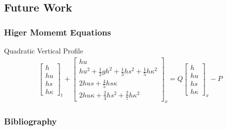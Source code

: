 \documentclass[10pt]{beamer}
\begin{document}
    \subsection{Future Work}
      \begin{frame}
        \frametitle{Higer Momemt Equations}
        Quadratic Vertical Profile
        \begin{align*}
          \begin{bmatrix}
            h \\
            hu \\
            hs \\
            h\kappa
          \end{bmatrix}_t +
          \begin{bmatrix}
            hu \\
            hu^2 + \frac{1}{2} gh^2 + \frac{1}{3}hs^2 + \frac{1}{5} h \kappa^2 \\
            2hus + \frac{4}{5}hs\kappa \\
            2hu\kappa + \frac{2}{3}hs^2 + \frac{2}{7}h \kappa^2
          \end{bmatrix}_x =
          Q
          \begin{bmatrix}
            h \\
            hu \\
            hs \\
            h\kappa
          \end{bmatrix}_x - P
        \end{align*}


      \end{frame}


    \begin{frame}[allowframebreaks]
      \frametitle{Bibliography}
      \nocite{*}
      \printbibliography{}
    \end{frame}
\end{document}

